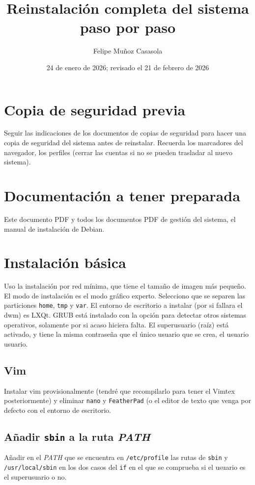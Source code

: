 \documentclass{article}
\title{Reinstalación completa del sistema paso por paso}
\author{Felipe Muñoz Casasola}
\date{24 de enero de 2026; revisado el 21 de febrero de 2026}
\begin{document}
    \maketitle
    \clearpage
    \tableofcontents
    \clearpage
    \section{Copia de seguridad previa}
    Seguir las indicaciones de los documentos de copias de seguridad para hacer
    una copia de seguridad del sistema antes de reinstalar. Recuerda los
    marcadores del navegador, los perfiles (cerrar las cuentas si no se pueden
    trasladar al nuevo sistema).

    \section{Documentación a tener preparada}
    Este documento PDF y todos los documentos PDF de gestión del sistema, el
    manual de instalación de Debian.

    \section{Instalación básica}
    Uso la instalación por red mínima, que tiene el tamaño de imagen más
    pequeño. El modo de instalación es el modo gráfico experto. Selecciono que
    se separen las particiones \texttt{home},
    \texttt{tmp} y \texttt{var}. El entorno de escritorio a instalar (por si
    fallara el dwm) es LXQt. GRUB está instalado con la opción para detectar
    otros sistemas operativos, solamente por si acaso hiciera falta. El
    superusuario (raíz) está activado, y tiene la misma contraseña que el único
    usuario que se crea, el usuario usuario.

    \subsection{Vim}
    Instalar vim provisionalmente (tendré que recompilarlo para tener el Vimtex
    posteriormente) y eliminar \texttt{nano} y \texttt{FeatherPad} (o el editor
    de texto que venga por defecto con el entorno de escritorio.

    \subsection{Añadir \texttt{sbin} a la ruta \textit{PATH}}
    Añadir en el \textit{PATH} que se encuentra en \texttt{/etc/profile} las
    rutas de \texttt{sbin} y \texttt{/usr/local/sbin} en los dos casos del
    \texttt{if} en el que se comprueba si el usuario es el superusuario o no.
\end{document}
